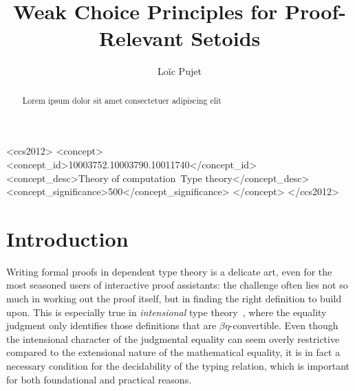\documentclass[acmsmall,screen,review]{acmart}
\begin{document}
\title{Weak Choice Principles for Proof-Relevant Setoids}

\author{Loïc Pujet}

\newcommand{\shepherd}[1]
   {{#1}}

%
%
\begin{CCSXML}
<ccs2012>
<concept>
<concept_id>10003752.10003790.10011740</concept_id>
<concept_desc>Theory of computation~Type theory</concept_desc>
<concept_significance>500</concept_significance>
</concept>
</ccs2012>
\end{CCSXML}

%
%



\begin{abstract}
Lorem ipsum dolor sit amet consectetuer adipiscing elit
\end{abstract}

\maketitle

\section{Introduction}

%
%
Writing formal proofs in dependent type theory is a delicate art, even for the most
seasoned users of interactive proof assistants: the challenge often lies
not so much in working out the proof itself, but in finding the right
definition to build upon.
%
This is especially true in \emph{intensional} type theory~\citep{itt}, where the
equality judgment only identifies those definitions that are
\( \beta \eta \)-convertible.
%
Even though the intensional character of the judgmental equality can seem overly
restrictive compared to the extensional nature of the mathematical equality,
%
it is in fact a necessary condition for the decidability of the typing relation,
which is important for both foundational and practical reasons.
%
\end{document}
